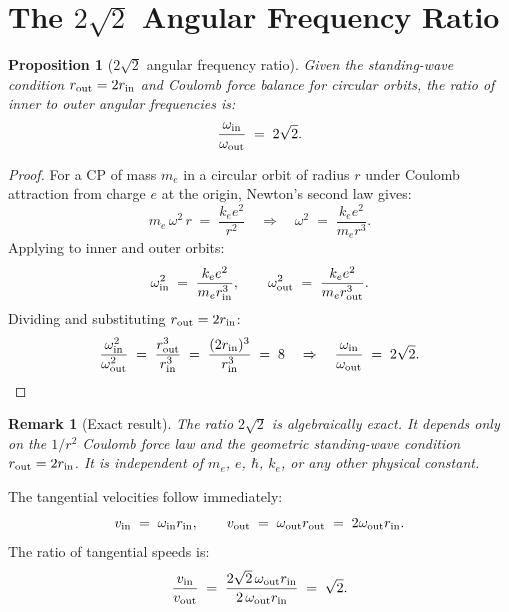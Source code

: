 \documentclass[12pt]{article}
\newtheorem{proposition}[theorem]{Proposition}
\newtheorem{remark}[theorem]{Remark}
\newcommand{\rin}{r_{\rm in}}
\newcommand{\rout}{r_{\rm out}}
\newcommand{\oin}{\omega_{\rm in}}
\newcommand{\oout}{\omega_{\rm out}}
\begin{document}
\section{The $2\sqrt{2}$ Angular Frequency Ratio}
\label{sec:ratio}

\begin{proposition}[$2\sqrt{2}$ angular frequency ratio]
\label{prop:ratio}
Given the standing-wave condition $\rout = 2\rin$ and Coulomb force
balance for circular orbits, the ratio of inner to outer angular
frequencies is:
\begin{equation}
  \frac{\oin}{\oout} \;=\; 2\sqrt{2}.
  \label{eq:ratio}
\end{equation}
\end{proposition}

\begin{proof}
For a CP of mass $m_e$ in a circular orbit of radius $r$ under
Coulomb attraction from charge $e$ at the origin, Newton's second law
gives:
\begin{equation}
  m_e\,\omega^2\,r \;=\; \frac{k_e e^2}{r^2}
  \quad\Rightarrow\quad
  \omega^2 \;=\; \frac{k_e e^2}{m_e r^3}.
  \label{eq:force_balance}
\end{equation}
Applying to inner and outer orbits:
\begin{equation}
  \oin^2 \;=\; \frac{k_e e^2}{m_e \rin^3}, \qquad
  \oout^2 \;=\; \frac{k_e e^2}{m_e \rout^3}.
  \label{eq:both_omegas}
\end{equation}
Dividing and substituting $\rout = 2\rin$:
\begin{equation}
  \frac{\oin^2}{\oout^2}
  \;=\; \frac{\rout^3}{\rin^3}
  \;=\; \frac{(2\rin)^3}{\rin^3}
  \;=\; 8
  \quad\Rightarrow\quad
  \frac{\oin}{\oout} \;=\; 2\sqrt{2}.
  \label{eq:ratio_proof}
\end{equation}
\end{proof}

\begin{remark}[Exact result]
The ratio $2\sqrt{2}$ is algebraically exact.  It depends only on
the $1/r^2$ Coulomb force law and the geometric standing-wave
condition $\rout = 2\rin$.  It is independent of $m_e$, $e$, $\hbar$,
$k_e$, or any other physical constant.
\end{remark}

The tangential velocities follow immediately:
\begin{equation}
  v_{\rm in} \;=\; \oin\rin, \qquad
  v_{\rm out} \;=\; \oout\rout \;=\; 2\oout\rin.
  \label{eq:velocities}
\end{equation}
The ratio of tangential speeds is:
\begin{equation}
  \frac{v_{\rm in}}{v_{\rm out}}
  \;=\; \frac{2\sqrt{2}\,\oout\rin}{2\,\oout\rin}
  \;=\; \sqrt{2}.
  \label{eq:v_ratio}
\end{equation}
\end{document}
